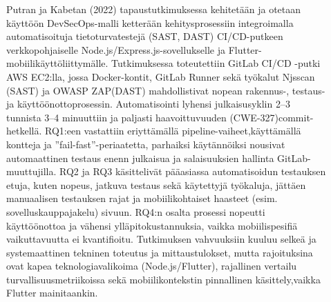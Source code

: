 \documentclass[bscthesis,finnish,oneside,biblatex]{uefcsthesis}
\begin{document}
\begin{description}
    \item[\cite{putra2022_devsecops}]Putran ja Kabetan (2022) tapaustutkimuksessa kehitetään ja otetaan käyttöön DevSecOps-malli ketterään kehitysprosessiin integroimalla automatisoituja tietoturvatestejä (SAST, DAST) CI/CD-putkeen verkkopohjaiselle Node.js/Express.js-sovellukselle ja Flutter-mobiilikäyttöliittymälle. Tutkimuksessa toteutettiin GitLab CI/CD -putki AWS EC2:lla, jossa Docker-kontit, GitLab Runner sekä työkalut Njsscan (SAST) ja OWASP ZAP(DAST) mahdollistivat nopean rakennus-, testaus- ja käyttöönottoprosessin. Automatisointi lyhensi julkaisusyklin 2–3 tunnista 3–4 minuuttiin ja paljasti haavoittuvuuden (CWE-327)commit-hetkellä. RQ1:een vastattiin eriyttämällä pipeline-vaiheet,käyttämällä kontteja ja ”fail-fast”-periaatetta, parhaiksi käytännöiksi nousivat automaattinen testaus enenn julkaisua ja salaisuuksien hallinta GitLab-muuttujilla. RQ2 ja RQ3 käsittelivät pääasiassa automatisoidun testauksen etuja, kuten nopeus, jatkuva testaus sekä käytettyjä työkaluja, jättäen manuaalisen testauksen rajat ja mobiilikohtaiset haasteet (esim. sovelluskauppajakelu) sivuun. RQ4:n osalta prosessi nopeutti käyttöönottoa ja vähensi ylläpitokustannuksia, vaikka mobiilispesifiä vaikuttavuutta ei kvantifioitu. Tutkimuksen vahvuuksiin kuuluu selkeä ja systemaattinen tekninen toteutus ja mittaustulokset, mutta rajoituksina ovat kapea teknologiavalikoima (Node.js/Flutter), rajallinen vertailu turvallisuusmetriikoissa sekä mobiilikontekstin pinnallinen käsittely,vaikka Flutter mainitaankin.
\end{description}
\end{document}

